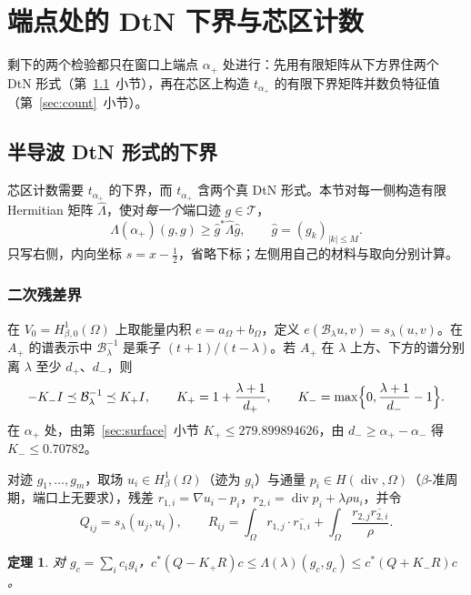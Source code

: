 \documentclass[11pt,a4paper,fontset=fandol]{ctexart}
\newcommand{\Tr}{\mathcal T}
\theoremstyle{plain}
\newtheorem{theorem}{定理}[section]
\theoremstyle{definition}
\theoremstyle{remark}
\begin{document}
\section{端点处的 DtN 下界与芯区计数}
\label{sec:endpoint}
剩下的两个检验都只在窗口上端点 $\alpha_+$ 处进行：先用有限矩阵从下方界住两个 DtN 形式（第~\ref{sec:dtn}~小节），再在芯区上构造 $t_{\alpha_+}$ 的有限下界矩阵并数负特征值（第~\ref{sec:count}~小节）。

\subsection{半导波 DtN 形式的下界}
\label{sec:dtn}
芯区计数需要 $t_{\alpha_+}$ 的下界，而 $t_{\alpha_+}$ 含两个真 DtN 形式。本节对每一侧构造有限 Hermitian 矩阵 $\hat\Lambda$，使对\emph{每一个}端口迹 $g\in\Tr$，
\[
\Lambda(\alpha_+)(g,g)\ge\hat g^*\hat\Lambda\hat g,\qquad\hat g=(g_k)_{|k|\le M}.
\]
只写右侧，内向坐标 $s=x-\frac12$，省略下标；左侧用自己的材料与取向分别计算。

\subsubsection{二次残差界}

在 $V_0=H^1_{\beta,0}(\Omega)$ 上取能量内积 $e=a_\Omega+b_\Omega$，定义 $e(\mathcal B_\lambda u,v)=s_\lambda(u,v)$。在 $A_+$ 的谱表示中 $\mathcal B_\lambda^{-1}$ 是乘子 $(t+1)/(t-\lambda)$。若 $A_+$ 在 $\lambda$ 上方、下方的谱分别离 $\lambda$ 至少 $d_+$、$d_-$，则
\begin{equation}
\label{eq:Kpm}
-K_-I\preceq\mathcal B_\lambda^{-1}\preceq K_+I,\qquad K_+=1+\frac{\lambda+1}{d_+},\qquad K_-=\max\Bigl\{0,\frac{\lambda+1}{d_-}-1\Bigr\}.
\end{equation}
在 $\alpha_+$ 处，由第~\ref{sec:surface}~小节 $K_+\le279.899894626$，由 $d_-\ge\alpha_+-\alpha_-$ 得 $K_-\le0.70782$。

对迹 $g_1,\dots,g_m$，取场 $u_i\in H^1_\beta(\Omega)$（迹为 $g_i$）与通量 $p_i\in H(\operatorname{div},\Omega)$（$\beta$-准周期，端口上无要求），残差 $r_{1,i}=\nabla u_i-p_i$，$r_{2,i}=\operatorname{div}p_i+\lambda\rho u_i$，并令
\begin{equation}
\label{eq:QR}
Q_{ij}=s_\lambda(u_j,u_i),\qquad R_{ij}=\int_\Omega r_{1,j}\cdot\overline{r_{1,i}}+\int_\Omega\frac{r_{2,j}\overline{r_{2,i}}}\rho .
\end{equation}

\begin{theorem}
\label{thm:dtn-two-sided}
对 $g_c=\sum_ic_ig_i$，$c^*(Q-K_+R)c\le\Lambda(\lambda)(g_c,g_c)\le c^*(Q+K_-R)c$。
\end{theorem}
\end{document}
